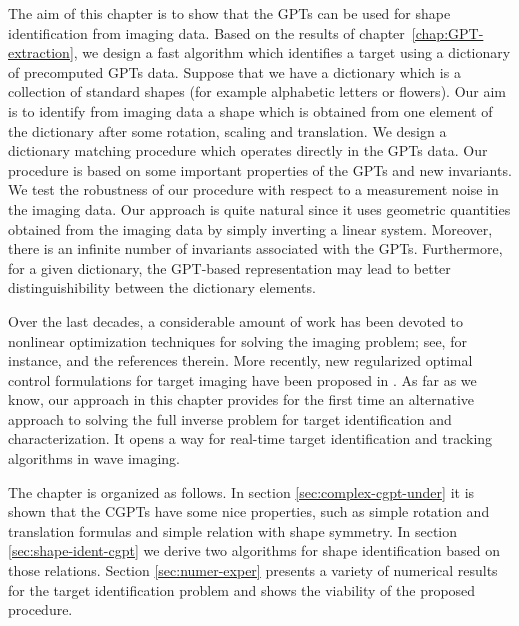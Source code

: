 The aim of this chapter is to show that the GPTs can be used for
shape identification from imaging data. Based on the results of
chapter~\ref{chap:GPT-extraction}, we design a fast algorithm which
identifies a target using a dictionary of precomputed GPTs data.
Suppose that we have a
dictionary which is a collection of standard shapes (for example
alphabetic letters or flowers). Our aim is to identify from
imaging data a shape which is obtained from one element of the
dictionary after some rotation, scaling and translation. We design
a dictionary matching procedure which operates directly in the
GPTs data. Our procedure is based on some important properties of
the GPTs and new invariants. We test the robustness of our
procedure with respect to a measurement noise in the imaging data.
Our approach is quite natural since it uses geometric quantities
obtained from the imaging data by simply inverting a linear
system. Moreover, there is an infinite number of invariants
associated with the GPTs. Furthermore, for a given dictionary, the
GPT-based representation may lead to better distinguishibility
between the dictionary elements.


Over the last decades, a considerable amount of work has been
devoted to nonlinear optimization techniques for solving the
imaging problem; see, for instance, \cite{opt,opt1,opt2} and the
references therein. More recently, new regularized optimal control
formulations for target imaging have been proposed in
\cite{optnew1,optnew2}. As far as we know, our approach in this
chapter provides for the first time an alternative approach to
solving the full inverse problem for target identification and
characterization. It opens a way for real-time target
identification and tracking algorithms in wave imaging.

The chapter is organized as follows. In section
\ref{sec:complex-cgpt-under} it is shown that the CGPTs have some
nice properties, such as simple rotation and translation formulas and
simple relation with shape symmetry. In section \ref{sec:shape-ident-cgpt}
we derive two algorithms for shape identification based on those relations.
Section \ref{sec:numer-exper} presents
a variety of numerical results for the target identification
problem and shows the viability of the proposed procedure.

